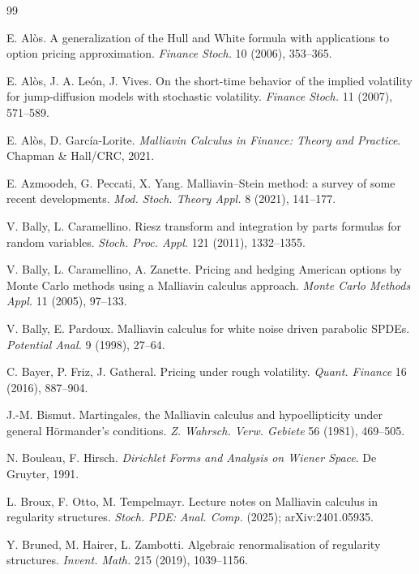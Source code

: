\begin{thebibliography}{99}

 E. Alòs. A generalization of the Hull and White formula with applications to option pricing
approximation. \emph{Finance Stoch.} 10 (2006), 353--365.

 E. Alòs, J. A. León, J. Vives. On the short-time behavior of the implied volatility for jump-diffusion
models with stochastic volatility. \emph{Finance Stoch.} 11 (2007), 571--589.

 E. Alòs, D. García-Lorite. \emph{Malliavin Calculus in Finance: Theory and Practice}. Chapman \&
Hall/CRC, 2021.

 E. Azmoodeh, G. Peccati, X. Yang. Malliavin--Stein method: a survey of some recent developments.
\emph{Mod. Stoch. Theory Appl.} 8 (2021), 141--177.

 V. Bally, L. Caramellino. Riesz transform and integration by parts formulas for random variables.
\emph{Stoch. Proc. Appl.} 121 (2011), 1332--1355.

 V. Bally, L. Caramellino, A. Zanette. Pricing and hedging American options by Monte Carlo
methods using a Malliavin calculus approach. \emph{Monte Carlo Methods Appl.} 11 (2005), 97--133.

 V. Bally, E. Pardoux. Malliavin calculus for white noise driven parabolic SPDEs. \emph{Potential Anal.} 9
(1998), 27--64.

 C. Bayer, P. Friz, J. Gatheral. Pricing under rough volatility. \emph{Quant. Finance} 16 (2016), 887--904.

 J.-M. Bismut. Martingales, the Malliavin calculus and hypoellipticity under general Hörmander's
conditions. \emph{Z. Wahrsch. Verw. Gebiete} 56 (1981), 469--505.

 N. Bouleau, F. Hirsch. \emph{Dirichlet Forms and Analysis on Wiener Space}. De Gruyter, 1991.

 L. Broux, F. Otto, M. Tempelmayr. Lecture notes on Malliavin calculus in regularity structures.
\emph{Stoch. PDE: Anal. Comp.} (2025); arXiv:2401.05935.

 Y. Bruned, M. Hairer, L. Zambotti. Algebraic renormalisation of regularity structures. \emph{Invent.
Math.} 215 (2019), 1039--1156.


\end{thebibliography}
